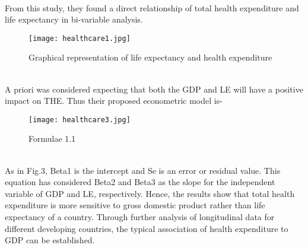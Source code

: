 \documentclass[conference]{IEEEtran}
\begin{document}
\\From this study, they found a direct relationship of total health expenditure and life expectancy in bi-variable analysis.
\begin{figure}[htbp]
    \centerline{\texttt{[image: healthcare1.jpg]}}
    \caption{Graphical representation of life expectancy and health expenditure}
\end{figure}
\\A priori was considered expecting that both the GDP and LE will have a positive impact on THE. Thus their proposed econometric model is-
\begin{figure}[htbp]
    \centerline{\texttt{[image: healthcare3.jpg]}}
    \caption{Formulae 1.1}
\end{figure}
\\As in Fig.3, Beta1 is the intercept and Se is an error or residual value. This equation has considered Beta2 and Beta3 as the slope for the independent variable of GDP and LE, respectively.
Hence, the results show that total health expenditure is more sensitive to gross domestic product rather than life expectancy of a country. Through further analysis of longitudinal data for different developing countries, the typical association of health expenditure to GDP can be established.
\bigskip
\end{document}
